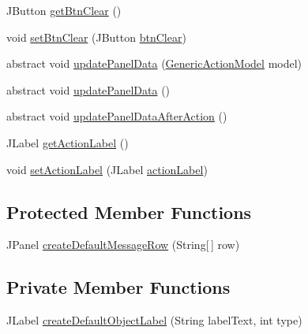 \begin{DoxyCompactItemize}
\item 
J\-Button \hyperlink{classcom_1_1poly_1_1nlp_1_1filekommander_1_1views_1_1panels_1_1_abstract_message_panel_ab88a15cf8a7d5f3a3266342841b8ea13}{get\-Btn\-Clear} ()
\item 
void \hyperlink{classcom_1_1poly_1_1nlp_1_1filekommander_1_1views_1_1panels_1_1_abstract_message_panel_ad2c1bd073c20d8e9dfcd1bdf0b2f27ba}{set\-Btn\-Clear} (J\-Button \hyperlink{classcom_1_1poly_1_1nlp_1_1filekommander_1_1views_1_1panels_1_1_abstract_message_panel_af85293e132ba96e5c707b39c418260c3}{btn\-Clear})
\item 
abstract void \hyperlink{classcom_1_1poly_1_1nlp_1_1filekommander_1_1views_1_1panels_1_1_abstract_message_panel_a9e5c061f76725ea2cbc6db991e1e4968}{update\-Panel\-Data} (\hyperlink{interfacecom_1_1poly_1_1nlp_1_1filekommander_1_1views_1_1models_1_1_generic_action_model}{Generic\-Action\-Model} model)
\item 
abstract void \hyperlink{classcom_1_1poly_1_1nlp_1_1filekommander_1_1views_1_1panels_1_1_abstract_message_panel_a1c0fcce6b9a3e540c8985c69bea60cd3}{update\-Panel\-Data} ()
\item 
abstract void \hyperlink{classcom_1_1poly_1_1nlp_1_1filekommander_1_1views_1_1panels_1_1_abstract_message_panel_a305ad7e0b41448b92cfc567062fbb874}{update\-Panel\-Data\-After\-Action} ()
\item 
J\-Label \hyperlink{classcom_1_1poly_1_1nlp_1_1filekommander_1_1views_1_1panels_1_1_abstract_message_panel_a0b449a096a5bd31e4eb1bb90daa6bf77}{get\-Action\-Label} ()
\item 
void \hyperlink{classcom_1_1poly_1_1nlp_1_1filekommander_1_1views_1_1panels_1_1_abstract_message_panel_a51f97279213dbc80136b483082f5ac56}{set\-Action\-Label} (J\-Label \hyperlink{classcom_1_1poly_1_1nlp_1_1filekommander_1_1views_1_1panels_1_1_abstract_message_panel_a1942c7082090f64dafda75c91d7d8f3e}{action\-Label})
\end{DoxyCompactItemize}
\subsection*{Protected Member Functions}
\begin{DoxyCompactItemize}
\item 
J\-Panel \hyperlink{classcom_1_1poly_1_1nlp_1_1filekommander_1_1views_1_1panels_1_1_abstract_message_panel_aa28d1e99f183f68a2e9ecc75d9292981}{create\-Default\-Message\-Row} (String\mbox{[}$\,$\mbox{]} row)
\end{DoxyCompactItemize}
\subsection*{Private Member Functions}
\begin{DoxyCompactItemize}
\item 
J\-Label \hyperlink{classcom_1_1poly_1_1nlp_1_1filekommander_1_1views_1_1panels_1_1_abstract_message_panel_a623b9852884a79f9db920f3e3444ac47}{create\-Default\-Object\-Label} (String label\-Text, int type)
\end{DoxyCompactItemize}
